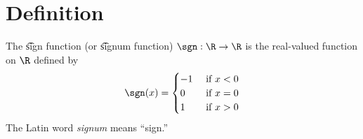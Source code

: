 
\section*{Definition}

The \t{sign function} (or \t{signum function}) $\sgn: \R  \to \R $ is the real-valued function on $\R $ defined by
\[
\sgn(x) = \begin{cases}
-1 & \text{ if } x < 0 \\
0 & \text{ if } x = 0 \\
1 & \text{ if } x > 0 \\
\end{cases}
\]
The Latin word \textit{signum} means ``sign.''

\blankpage